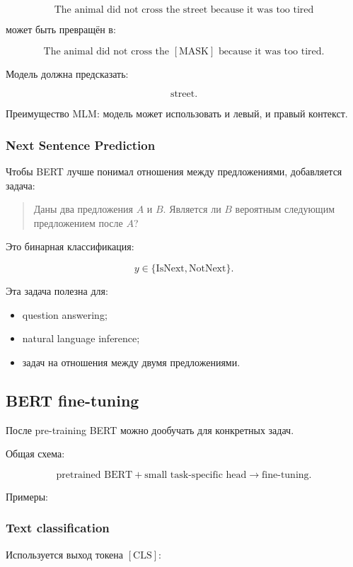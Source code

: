 \documentclass[a4paper,12pt]{article}
\begin{document}
\[
\text{The animal did not cross the street because it was too tired}
\]

может быть превращён в:

\[
\text{The animal did not cross the } [\text{MASK}] \text{ because it was too tired}.
\]

Модель должна предсказать:

\[
\text{street}.
\]

Преимущество MLM: модель может использовать и левый, и правый контекст.

\subsubsection{Next Sentence Prediction}

Чтобы BERT лучше понимал отношения между предложениями, добавляется задача:

\begin{quote}
Даны два предложения \(A\) и \(B\). Является ли \(B\) вероятным следующим предложением после \(A\)?
\end{quote}

Это бинарная классификация:

\[
y \in \{\text{IsNext}, \text{NotNext}\}.
\]

Эта задача полезна для:

\begin{itemize}
    \item question answering;
    \item natural language inference;
    \item задач на отношения между двумя предложениями.
\end{itemize}

\subsection{BERT fine-tuning}

После pre-training BERT можно дообучать для конкретных задач.

Общая схема:

\[
\text{pretrained BERT}
+
\text{small task-specific head}
\rightarrow
\text{fine-tuning}.
\]

Примеры:

\subsubsection{Text classification}

Используется выход токена \([\text{CLS}]\):
\end{document}
